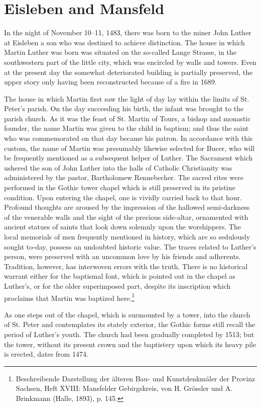 \section{Eisleben and Mansfeld}

In the night of November 10--11, 1483, there was born to the miner
John Luther at Eisleben a son who was destined to achieve distinction.
The house in which Martin Luther was born was situated on the so-called
Lange Strasse, in the southwestern part of the little city, which
was encircled by walls and towers. Even at the present day the
somewhat deteriorated building is partially preserved, the upper story only
having been reconstructed because of a fire in 1689.

The house in which Martin first saw the light of day lay within the
limits of St. Peter’s parish. On the day succeeding his birth, the infant
was brought to the parish church. As it was the feast of St. Martin of
Tours, a bishop and monastic founder, the name Martin was given
to the child in baptism; and thus the saint who was commemorated on that day became his patron. In accordance with this custom,
the name of Martin was presumably likewise selected for Bucer, who
will be frequently mentioned as a subsequent helper of Luther. The
Sacrament which ushered the son of John Luther into the halls of Catholic Christianity was administered by the pastor, Bartholomew Rennebecher.
The sacred rites were performed in the Gothic tower chapel
which is still preserved in its pristine condition. Upon entering the
chapel, one is vividly carried back to that hour. Profound thoughts are
aroused by the impression of the hallowed semi-darkness of the venerable walls and the sight of the precious side-altar, ornamented with
ancient statues of saints that look down solemnly upon the worshippers.
The local memorials of men frequently mentioned in history, which are
so sedulously sought to-day, possess an undoubted historic value. The
traces related to Luther’s person, were preserved with an uncommon
love by his friends and adherents. Tradition, however, has interwoven
errors with the truth. There is no historical warrant either for the baptismal font, which is pointed out in the chapel as Luther’s, or for the older superimposed part, despite its inscription which proclaims that
Martin was baptized here.\footnote{Beschreibende Darstellung der älteren Bau- und Kunstdenkmäler der Provinz Sachsen, Heft XVIII: Mansfelder Gebirgskreis, von H. Grössler und A. Brinkmann (Halle, 1893), p. 145.}

As one steps out of the chapel, which is surmounted by a tower, into
the church of St. Peter and contemplates its stately exterior, the Gothic
forms still recall the period of Luther’s youth. The church had been
gradually completed by 1513; but the tower, without its present
crown and the baptistery upon which its heavy pile is erected, dates
from 1474.

